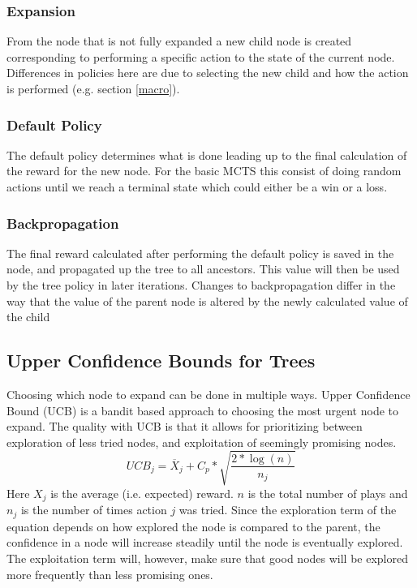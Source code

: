 \documentclass[10pt,a4paper]{article}
\begin{document}
\subsubsection{Expansion}
From the node that is not fully expanded a new child node is created corresponding to performing a specific action to the state of the current node. Differences in policies here are due to selecting the new child and how the action is performed (e.g. section \ref{macro}).
\subsubsection{Default Policy}
The default policy determines what is done leading up to the final calculation of the reward for the new node. For the basic MCTS this consist of doing random actions until we reach a terminal state which could either be a win or a loss.
\subsubsection{Backpropagation}
The final reward calculated after performing the default policy is saved in the node, and propagated up the tree to all ancestors. This value will then be used by the tree policy in later iterations. Changes to backpropagation differ in the way that the value of the parent node is altered by the newly calculated value of the child

\subsection{Upper Confidence Bounds for Trees}
Choosing which node to expand can be done in multiple ways. Upper Confidence Bound (UCB) is a bandit based approach to choosing the most urgent node to expand. The quality with UCB is that it allows for prioritizing between exploration of less tried nodes, and exploitation of seemingly promising nodes.
\begin{equation}
\label{eq:ucb1}
\displaystyle UCB_j = \overline{X}_j + C_p * \sqrt{\frac{2 * \log(n)}{n_j}}
\end{equation}
Here $X_j$ is the average (i.e. expected) reward. $n$ is the total number of plays and $n_j$ is the number of times action $j$ was tried. Since the exploration term of the equation depends on how explored the node is compared to the parent, the confidence in a node will increase steadily until the node is eventually explored. The exploitation term will, however, make sure that good nodes will be explored more frequently than less promising ones.
\end{document}
